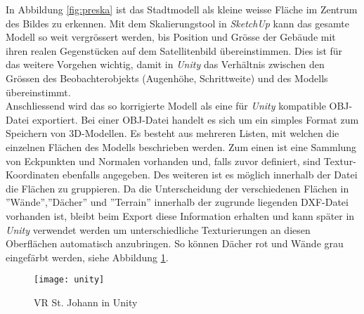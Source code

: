 In Abbildung \ref{fig:preska} ist das Stadtmodell als kleine weisse Fläche im Zentrum des Bildes zu erkennen.  Mit dem Skalierungstool in \textit{SketchUp} kann das gesamte Modell so weit vergrössert werden, bis Position und Grösse der Gebäude mit ihren realen Gegenstücken auf dem Satellitenbild übereinstimmen. Dies ist für das weitere Vorgehen wichtig, damit in \textit{Unity} das Verhältnis zwischen den Grössen des Beobachterobjekts (Augenhöhe, Schrittweite) und des Modells übereinstimmt.\\[6pt]
Anschliessend wird das so korrigierte Modell als eine für \textit{Unity} kompatible OBJ-Datei exportiert. Bei einer OBJ-Datei handelt es sich um ein simples Format zum Speichern von 3D-Modellen. Es besteht aus mehreren Listen, mit welchen die einzelnen Flächen des Modells beschrieben werden. Zum einen ist eine Sammlung von Eckpunkten und Normalen vorhanden und, falls zuvor definiert, sind Textur-Koordinaten ebenfalls angegeben. Des weiteren ist es möglich innerhalb der Datei die Flächen zu gruppieren. Da die Unterscheidung der verschiedenen Flächen in ''Wände'',''Dächer'' und ''Terrain'' innerhalb der zugrunde liegenden DXF-Datei vorhanden ist, bleibt beim Export diese Information erhalten und kann später in \textit{Unity} verwendet werden um unterschiedliche Texturierungen an diesen Oberflächen automatisch anzubringen. So können Dächer rot und Wände grau eingefärbt werden, siehe Abbildung \ref{unity}.\\[6pt]

\begin{figure}[hbt]
	\vspace{-25pt}
	\begin{center}
		\texttt{[image: unity]}
	\end{center}
	\vspace{-15pt}
	\caption{VR St. Johann in Unity}\label{unity}
	\vspace{-15pt}
\end{figure}

